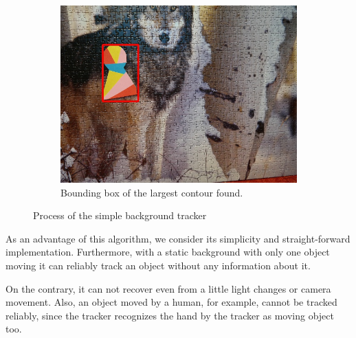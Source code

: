 \begin{figure}
\begin{subfigure}[b]{0.48\linewidth}
    \includegraphics[width=\linewidth]{img/simple_background/result.jpg}
    \caption{Bounding box of the largest contour found.}
  \end{subfigure}
  \caption{Process of the simple background tracker}
  \label{fig:simple-background-tracker}
\end{figure}

As an advantage of this algorithm, we consider its simplicity and
straight-forward implementation. Furthermore, with a static background with
only one object moving it can reliably track an object without any information
about it.

On the contrary, it can not recover even from a little light changes or camera
movement. Also, an object moved by a human, for example, cannot be tracked
reliably, since the tracker recognizes the hand by the tracker as moving object
too.

%
%
%

